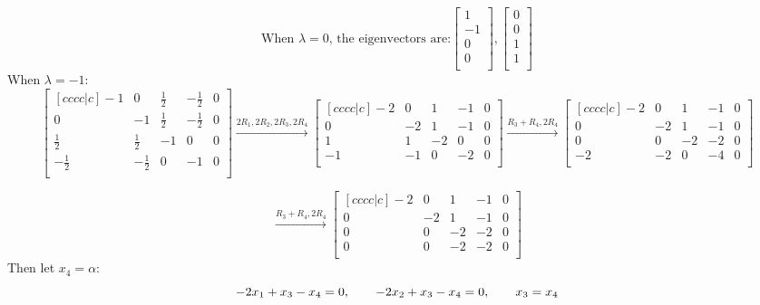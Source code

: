 \documentclass[12pt]{article}
\begin{document}
$$
\text{When $\lambda=0$, the eigenvectors are:}
\begin{bmatrix}
	1 \\
	-1 \\
	0 \\
	0 \\
\end{bmatrix},
\begin{bmatrix}
	0 \\
	0 \\
	1 \\
	1 \\
\end{bmatrix}
$$
When $\lambda=-1$:
$$
\begin{bmatrix}[cccc|c]
-1 & 0 & \frac{1}{2} & -\frac{1}{2} & 0 \\
0 & -1 & \frac{1}{2} & -\frac{1}{2} & 0 \\
\frac{1}{2} & \frac{1}{2} & -1 & 0 & 0 \\
-\frac{1}{2} & -\frac{1}{2} & 0 & -1 & 0 \\
\end{bmatrix}
\overset{2R_1, 2R_2, 2R_3, 2R_4}{\longrightarrow} 
\begin{bmatrix}[cccc|c]
-2 & 0 & 1 & -1 & 0 \\
0 & -2 & 1 & -1 & 0 \\
1 & 1 & -2 & 0 & 0 \\
-1 & -1 & 0 & -2 & 0 \\
\end{bmatrix}
\overset{R_3+R_4, 2R_4}{\longrightarrow} 
\begin{bmatrix}[cccc|c]
-2 & 0 & 1 & -1 & 0 \\
0 & -2 & 1 & -1 & 0 \\
0 & 0 & -2 & -2 & 0 \\
-2 & -2 & 0 & -4 & 0 \\
\end{bmatrix}
$$

$$
\overset{R_3+R_4, 2R_4}{\longrightarrow} 
\begin{bmatrix}[cccc|c]
-2 & 0 & 1 & -1 & 0 \\
0 & -2 & 1 & -1 & 0 \\
0 & 0 & -2 & -2 & 0 \\
0 & 0 & -2 & -2 & 0 \\
\end{bmatrix}
$$
Then let $x_4=\alpha$:
$$
-2x_1+x_3-x_4=0, \hspace{20px}
-2x_2+x_3-x_4=0, \hspace{20px}
x_3=x_4
$$
\end{document}
